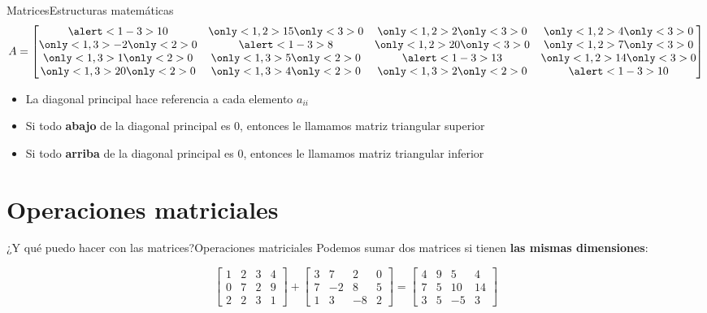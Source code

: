 \documentclass[spanish, c]{beamer}
\begin{document}
\begin{frame}{Matrices}{Estructuras matemáticas}
    \[%
        A =
        \begin{bmatrix}
        \alert<1-3>{10}            & \only<1,2>{15} \only<3>{0} & \only<1,2>{2} \only<3>{0}  & \only<1,2>{4} \only<3>{0} \\
        \only<1,3>{-2} \only<2>{0} & \alert<1-3>{8}             & \only<1,2>{20} \only<3>{0} & \only<1,2>{7} \only<3>{0} \\
        \only<1,3>{1} \only<2>{0}  & \only<1,3>{5} \only<2>{0}  & \alert<1-3>{13}             & \only<1,2>{14} \only<3>{0} \\
        \only<1,3>{20} \only<2>{0} & \only<1,3>{4} \only<2>{0}  & \only<1,3>{2} \only<2>{0}  & \alert<1-3>{10}
        \end{bmatrix}
    \]

    \begin{itemize}
        \item La \alert<1>{diagonal principal} hace referencia a cada elemento $a_{ii}$
        \item Si todo \textbf{abajo} de la diagonal principal es 0, entonces le llamamos \alert<2>{matriz triangular superior}
        \item Si todo \textbf{arriba} de la diagonal principal es 0, entonces le llamamos \alert<3>{matriz triangular inferior}
    \end{itemize}

\end{frame}

\section{Operaciones matriciales}

\begin{frame}{¿Y qué puedo hacer con las matrices?}{Operaciones matriciales}
    Podemos \alert{sumar dos matrices} si tienen \textbf{las mismas dimensiones}:

    \[%
        \begin{bmatrix}
            1 & 2 & 3 & 4 \\
            0 & 7 & 2 & 9 \\
            2 & 2 & 3 & 1
        \end{bmatrix} +
        \begin{bmatrix}
            3 & 7 & 2 & 0 \\
            7 & -2 & 8 & 5 \\
            1 & 3 & -8 & 2
        \end{bmatrix} =
        \begin{bmatrix}
            4 & 9 & 5 & 4 \\
            7 & 5& 10 & 14 \\
            3 & 5 & -5 & 3
        \end{bmatrix} \]

\end{frame}
\end{document}

